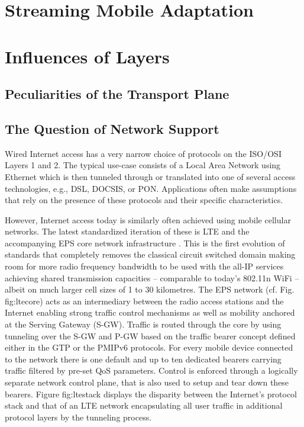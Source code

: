 \section{Streaming Mobile Adaptation}



\section{Influences of Layers}
\subsection{Peculiarities of the Transport Plane}
\subsection{The Question of Network Support}




Wired Internet access has a very narrow choice of protocols on the ISO/OSI Layers 1 and 2. The typical use-case consists of a Local Area Network using Ethernet which is then tunneled through or translated into one of several access technologies, e.g., DSL, DOCSIS, or PON. Applications often make assumptions that rely on the presence of these protocols and their specific characteristics.

However, Internet access today is similarly often achieved using mobile cellular networks. The latest standardized iteration of these is LTE and the accompanying EPS core network infrastructure \cite{olsson2009sae}. This is the first evolution of standards that completely removes the classical circuit switched domain making room for more radio frequency bandwidth to be used with the all-IP services achieving shared transmission capacities -- comparable to today's 802.11n WiFi -- albeit on much larger cell sizes of 1 to 30 kilometres. The EPS network (cf. Fig. fig:ltecore) acts as an intermediary between the radio access stations and the Internet enabling strong traffic control mechanisms as well as mobility anchored at the Serving Gateway (S-GW). Traffic is routed through the core by using tunneling over the S-GW and P-GW based on the traffic bearer concept defined either in the GTP or the PMIPv6 protocols. For every mobile device connected to the network there is one default and up to ten dedicated bearers carrying traffic filtered by pre-set QoS parameters. Control is enforced through a logically separate network control plane, that is also used to setup and tear down these bearers. Figure fig:ltestack displays the disparity between the Internet's protocol stack and that of an LTE network encapsulating all user traffic in additional protocol layers by the tunneling process.


